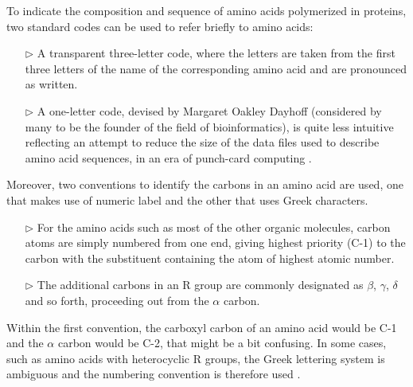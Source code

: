 To indicate the composition and sequence of amino acids polymerized in proteins, two standard codes can be used to refer briefly to amino acids:
\begin{itemize}
\item[$\triangleright$] A transparent three-letter code, where the letters are taken from the first three letters of the name of the corresponding amino acid and are pronounced as written.
\item[$\triangleright$]  A one-letter code, devised by Margaret Oakley Dayhoff (considered by many to be the founder of the field of bioinformatics), is quite less intuitive reflecting an attempt to reduce the size of the data files used to describe amino acid sequences, in an era of punch-card computing
\cite{nelson2008lehninger}. 
\end{itemize}
Moreover, two conventions to identify the carbons in an amino acid are used, one that makes use of numeric label and the other that uses Greek characters.
\begin{itemize}
\item[$\triangleright$] For the amino acids such as most of the other organic molecules, carbon atoms are simply numbered from one end, giving highest priority (C-1) to the carbon with the substituent containing the atom of highest atomic number.
\item[$\triangleright$] The additional carbons in an R group are commonly designated as $\beta$, $\gamma$, $\delta$ and so forth, proceeding out from the  $\alpha$ carbon.
\end{itemize} 
Within the first convention, the carboxyl carbon of an amino acid would be C-1 and the  $\alpha$ carbon would be C-2, that might be a bit confusing. In some cases, such as amino acids with heterocyclic R groups, the Greek lettering system is ambiguous and the numbering convention is therefore used \cite{nelson2008lehninger}.

